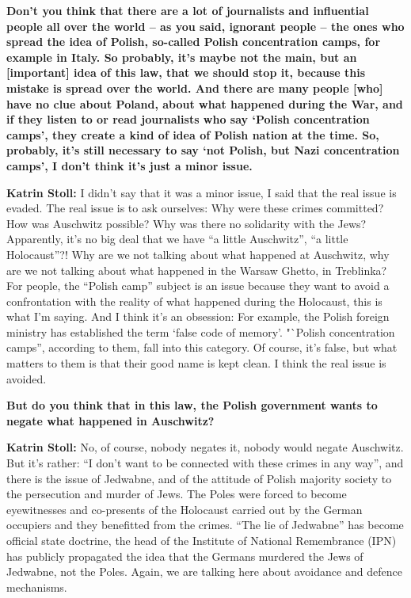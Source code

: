 \textbf{Don’t you think that there are a lot of journalists and influential people all over the world – as you said, ignorant people – the ones who spread the idea of Polish, so-called Polish concentration camps, for example in Italy. So probably, it’s maybe not the main, but an [important] idea of this law, that we should stop it, because this mistake is spread over the world. And there are many people [who] have no clue about Poland, about what happened during the War, and if they listen to or read journalists who say ‘Polish concentration camps’, they create a kind of idea of Polish nation at the time. So, probably, it’s still necessary to say ‘not Polish, but Nazi concentration camps’, I don’t think it’s just a minor issue.} 

\textbf{Katrin Stoll:} I didn’t say that it was a minor issue, I said that the real issue is evaded. The real issue is to ask ourselves: Why were these crimes committed? How was Auschwitz possible? Why was there no solidarity with the Jews? Apparently, it’s no big deal that we have "`a little Auschwitz"', "`a little Holocaust"'?! Why are we not talking about what happened at Auschwitz, why are we not talking about what happened in the Warsaw Ghetto, in Treblinka? For people, the "`Polish camp"' subject is an issue because they want to avoid a confrontation with the reality of what happened during the Holocaust, this is what I’m saying. And I think it’s an obsession: For example, the Polish foreign ministry has established the term ‘false code of memory’. "`Polish concentration camps”, according to them, fall into this category. Of course, it’s false, but what matters to them is that their good name is kept clean. I think the real issue is avoided.

\textbf{But do you think that in this law, the Polish government wants to negate what happened in Auschwitz?} 

\textbf{Katrin Stoll:} No, of course, nobody negates it, nobody would negate Auschwitz. But it’s rather: "`I don’t want to be connected with these crimes in any way"', and there is the issue of Jedwabne, and of the attitude of Polish majority society to the persecution and murder of Jews. The Poles were forced to become eyewitnesses and co-presents of the Holocaust carried out by the German occupiers and they benefitted from the crimes.  "`The lie of Jedwabne"' has become official state doctrine, the head of the Institute of National Remembrance (IPN) has publicly propagated the idea that the Germans murdered the Jews of Jedwabne, not the Poles. Again, we are talking here about avoidance and defence mechanisms. 

